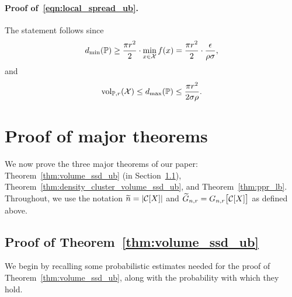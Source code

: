 \paragraph{Proof of~\eqref{eqn:local_spread_ub}.}
	The statement follows since 
	\begin{equation*}
	d_{\min}(\mathbb{P}) \geq \frac{\pi r^2}{2} \cdot \min_{x \in \mathcal{X}} f(x) = \frac{\pi r^2}{2} \cdot \frac{\epsilon}{\rho \sigma},
	\end{equation*}
	and
	\begin{equation*}
	\mathrm{vol}_{\mathbb{P},r}(\mathcal{X}) \leq d_{\max}(\mathbb{P}) \leq \frac{\pi r^2}{2 \sigma \rho}.
	\end{equation*}

\section{Proof of major theorems}
\label{apdx:pf_major_theorems}
We now prove the three major theorems of our paper: Theorem~\ref{thm:volume_ssd_ub} (in Section~\ref{subsec:pf_volume_ssd_ub}), Theorem~\ref{thm:density_cluster_volume_ssd_ub}, and Theorem~\ref{thm:ppr_lb}.  Throughout, we use the notation $\widetilde{n} = |\mathcal{C}[X]|$ and $\widetilde{G}_{n,r} = G_{n,r}\bigl[\mathcal{C}[X]\bigr]$ as defined above.

\subsection{Proof of Theorem~\ref{thm:volume_ssd_ub}}
\label{subsec:pf_volume_ssd_ub}
We begin by recalling some probabilistic estimates needed for the proof of Theorem~\ref{thm:volume_ssd_ub}, along with the probability with which they hold.

